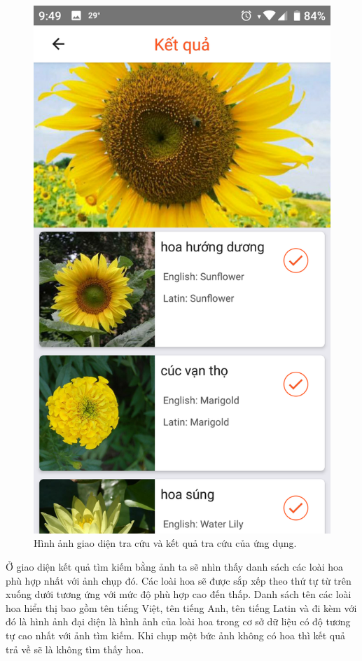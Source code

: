 \documentclass[12pt]{report}
\begin{document}
\begin{figure}[h]
			\includegraphics[scale=0.2]{app_search2}
			\caption{Hình ảnh giao diện tra cứu và kết quả tra cứu của ứng dụng.}
			\label{fig:app_search}
		\end{figure}

		Ở giao diện kết quả tìm kiếm bằng ảnh ta sẽ nhìn thấy danh sách các loài hoa phù hợp nhất với ảnh chụp đó. Các loài hoa sẽ được sắp xếp theo thứ tự từ trên xuống dưới tương ứng với mức độ phù hợp cao đến thấp. Danh sách tên các loài hoa hiển thị bao gồm tên tiếng Việt, tên tiếng Anh, tên tiếng Latin và đi kèm với đó là hình ảnh đại diện là hình ảnh của loài hoa trong cơ sở dữ liệu có độ tương tự cao nhất với ảnh tìm kiếm. Khi chụp một bức ảnh không có hoa thì kết quả trả về sẽ là không tìm thấy hoa.
\end{document}
